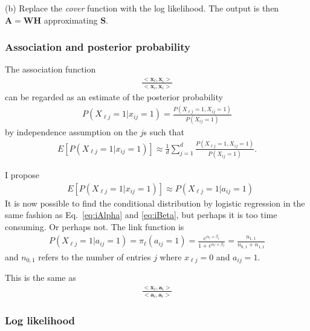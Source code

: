 \documentclass[12pt]{article}
\begin{document}
(b) Replace the {\it cover} function with the log likelihood. The output is then $\mathbf{A} = \mathbf{WH}$ approximating $\mathbf{S}$.

\subsubsection*{Association and posterior probability} %

The association function 
\begin{align}
 \frac{<\mathbf{x}_{\ell}, \mathbf{x}_i>}{<\mathbf{x}_{i},\mathbf{x}_{i}>}
\end{align}
can be regarded as an estimate of the posterior probability
\begin{align}
  P(X_{\ell j} = 1 | x_{i j} = 1) = \frac{P(X_{\ell j} = 1, X_{i j} = 1)}{P( X_{i j} = 1)}
\end{align}
by independence assumption on the $j$s such that 
\begin{align}
  E [ P(X_{\ell j} = 1 | x_{i j} = 1)] \approx  \frac{1}{d} \sum_{j = 1}^ d \frac{P(X_{\ell j} = 1, X_{i j} = 1)}{P( X_{i j} = 1)}.
\end{align}

I propose
\begin{align}
&   E [ P(X_{\ell j} = 1 | x_{i j} = 1)] \approx  P(X_{\ell j} = 1 | a_{i j} = 1)
\end{align}
It is now possible to find the conditional distribution by logistic regression in the same fashion as Eq.~\ref{eq:iAlpha} and \ref{eq:iBeta}, but perhaps it is too time consuming. 
Or perhaps not.
The link function is
\begin{align}
   P(X_{\ell j} = 1 | a_{i j} = 1) =  \pi_\ell(a_{ij}= 1) = \frac{e^{\alpha_{\ell} + \beta_{\ell}}}{1 + e^{\alpha_{\ell} + \beta_{\ell}}} = \frac{n_{1,1}}{n_{0,1} + n_{1,1}}
\end{align}
and $n_{0,1}$ refers to the number of entries $j$ where $x_{\ell j} = 0$ and $a_{ij} = 1$. 

This is the same as
\begin{align}
  \frac{<\mathbf{x}_{\ell},\mathbf{a}_i>}{<\mathbf{a}_{i},\mathbf{a}_{i}>}
\end{align}

\subsubsection*{Log likelihood} %
\end{document}
